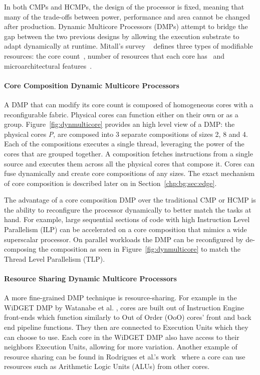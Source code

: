 In both CMPs and HCMPs, the design of the processor is fixed, meaning that many of the trade-offs between power, performance and area cannot be changed after production.
Dynamic Multicore Processors (DMPs) attempt to bridge the gap between the two previous designs by allowing the execution substrate to adapt dynamically at runtime.
Mitall's survey ~\cite{MittalSurv2016} defines three types of modifiable resources: the core count~\cite{ipek2007CoreFusion,kim2007tflex,pricopi2012bahurupi}, number of resources that each core has~\cite{Homayoun3DPooling2012} and microarchitectural features~\cite{fallinhetblock2014,BauerRSE08,tavanaElastic}.

\paragraph*{Core Composition Dynamic Multicore Processors}


A DMP that can modify its core count is composed of homogeneous cores with a reconfigurable fabric.
Physical cores can function either on their own or as a group.
Figure~\ref{fig:dynmulticore} provides an high level view of a DMP: the physical cores \textit{P}, are composed into 3 separate compositions of sizes 2, 8 and 4.
Each of the compositions executes a single thread, leveraging the power of the cores that are grouped together.
A composition fetches instructions from a single source and executes them across all the physical cores that compose it.
Cores can fuse dynamically and create core compositions of any sizes.
The exact mechanism of core composition is described later on in Section~\ref{chp:bg:sec:edge}.

The advantage of a core composition DMP over the traditional CMP or HCMP is the ability to reconfigure the processor dynamically to better match the tasks at hand.
For example, large sequential sections of code with high Instruction Level Parallelism (ILP) can be accelerated on a core composition that mimics a wide superscalar processor.
On parallel workloads the DMP can be reconfigured by de-composing the composition as seen in Figure~\ref{fig:dynmulticore} to match the Thread Level Parallelism (TLP).

\paragraph*{Resource Sharing Dynamic Multicore Processors}
A more fine-grained DMP technique is resource-sharing.
For example in the WiDGET DMP by Watanabe et al. \cite{Watanabe2010Widget}, cores are built out of Instruction Engine front-ends which function similarly to Out of Order (OoO) cores' front and back end pipeline functions.
They then are connected to Execution Units which they can choose to use.
Each core in the WiDGET DMP also have access to their neighbors Execution Units, allowing for more variation.
Another example of resource sharing can be found in Rodrigues et al.'s work~\cite{rodrigues2014perf} where a core can use resources such as Arithmetic Logic Units (ALUs) from other cores.

